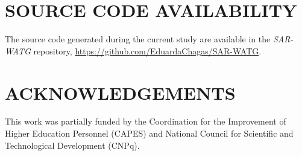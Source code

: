 \documentclass{isprs}
\begin{document}
\section{SOURCE CODE AVAILABILITY}

The source code generated during the current study are available in the \textit{SAR-WATG} repository, \url{https://github.com/EduardaChagas/SAR-WATG}.




\section*{ACKNOWLEDGEMENTS}\label{ACKNOWLEDGEMENTS}

This work was partially funded by the Coordination for the Improvement of Higher Education Personnel (CAPES) and National Council for Scientific and Technological Development (CNPq).
\end{document}
